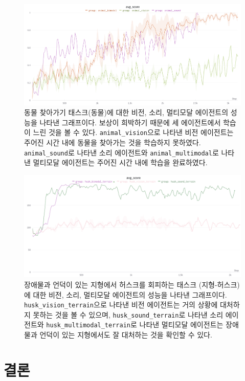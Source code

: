 \documentclass[oneside, under, ko]{snuthesis}
\begin{document}
\begin{figure}
    \centering
    \includegraphics[width=\textwidth]{animal.png}
    \caption{동물 찾아가기 태스크(동물)에 대한 비전, 소리, 멀티모달 에이전트의 성능을 나타낸 그래프이다. 보상이 희박하기 때문에 세 에이전트에서 학습이 느린 것을 볼 수 있다. \lstinline{animal_vision}으로 나타낸 비전 에이전트는 주어진 시간 내에 동물을 찾아가는 것을 학습하지 못하였다. \lstinline{animal_sound}로 나타낸 소리 에이전트와 \lstinline{animal_multimodal}로 나타낸 멀티모달 에이전트는 주어진 시간 내에 학습을 완료하였다.}
    \label{fig:animal}
\end{figure}
\begin{figure}
    \centering
    \includegraphics[width=\textwidth]{husk_terrain.png}
    \caption{장애물과 언덕이 있는 지형에서 허스크를 회피하는 태스크 (지형-허스크)에 대한 비전, 소리, 멀티모달 에이전트의 성능을 나타낸 그래프이다. \lstinline{husk_vision_terrain}으로 나타낸 비전 에이전트는 거의 상황에 대처하지 못하는 것을 볼 수 있으며, \lstinline{husk_sound_terrain}로 나타낸 소리 에이전트와 \lstinline{husk_multimodal_terrain}로 나타낸 멀티모달 에이전트는 장애물과 언덕이 있는 지형에서도 잘 대처하는 것을 확인할 수 있다.}
    \label{fig:husk_terrain}
\end{figure}

\chapter{결론}\label{chp:conclusion}
\end{document}

